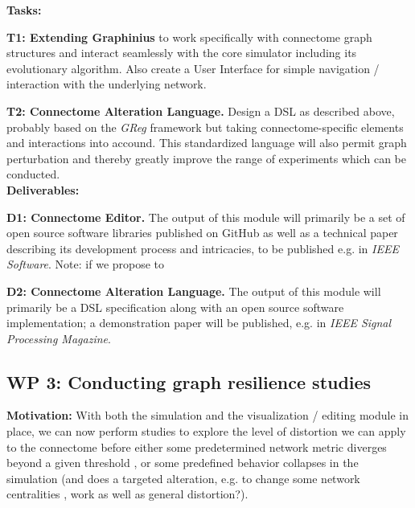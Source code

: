 \documentclass[a4paper,11pt]{article}
\begin{document}


\textbf{Tasks:}

\textbf{T1: Extending Graphinius} to work specifically with connectome graph structures and interact seamlessly with the core simulator including its evolutionary algorithm. Also create a User Interface for simple navigation / interaction with the underlying network.

\textbf{T2: Connectome Alteration Language.} Design a DSL as described above, probably based on the \emph{GReg} framework but taking connectome-specific elements and interactions into accound. This standardized language will also permit graph perturbation and thereby greatly improve the range of experiments which can be conducted.
\\[0,2cm]


\textbf{Deliverables:}

\textbf{D1: Connectome Editor.} The output of this module will primarily be a set of open source software libraries published on GitHub as well as a technical paper describing its development process and intricacies, to be published e.g. in \textit{IEEE Software}.
Note: if we propose to 

\textbf{D2: Connectome Alteration Language.} The output of this module will primarily be a DSL specification along with an open source software implementation; a demonstration paper will be published, e.g. in \textit{IEEE Signal Processing Magazine}.



\subsection{WP 3: Conducting graph resilience studies}

\textbf{Motivation:}
With both the simulation and the visualization / editing module in place, we can now perform studies to explore the level of distortion we can apply to the connectome before either some predetermined network metric diverges beyond a given threshold \citep{Science2016}, or some predefined behavior collapses in the simulation (and does a targeted alteration, e.g. to change some network centralities \citep{Crescenzi2016}, work as well as general distortion?). 
\end{document}
